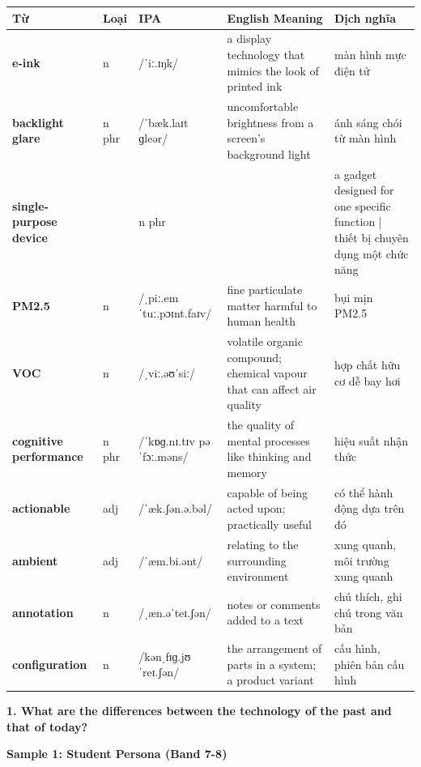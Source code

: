 \vspace{0.8em}
\begin{center}
\renewcommand{\arraystretch}{1.65}
\begin{tabularx}{\textwidth}{|V{0.22\textwidth}|C{0.07\textwidth}|I{0.20\textwidth}|Y|V{0.18\textwidth}|}
\hline
{}
\textbf{Từ} & \textbf{Loại} & \textbf{IPA} & \textbf{English Meaning} & \textbf{Dịch nghĩa} \\
\hline
\textbf{e-ink} & n & /ˈiː.ɪŋk/ & a display technology that mimics the look of printed ink & màn hình mực điện tử \\ \hline
\textbf{backlight glare} & n phr & /ˈbæk.laɪt ɡleər/ & uncomfortable brightness from a screen's background light & ánh sáng chói từ màn hình \\ \hline
\textbf{single-purpose device} & & n phr & & a gadget designed for one specific function | thiết bị chuyên dụng một chức năng \\ \hline
\textbf{PM2.5} & n & /ˌpiː.emˈtuː.pɔɪnt.faɪv/ & fine particulate matter harmful to human health & bụi mịn PM2.5 \\ \hline
\textbf{VOC} & n & /ˌviː.əʊˈsiː/ & volatile organic compound; chemical vapour that can affect air quality & hợp chất hữu cơ dễ bay hơi \\ \hline
\textbf{cognitive performance} & n phr & /ˈkɒɡ.nɪ.tɪv pəˈfɔː.məns/ & the quality of mental processes like thinking and memory & hiệu suất nhận thức \\ \hline
\textbf{actionable} & adj & /ˈæk.ʃən.ə.bəl/ & capable of being acted upon; practically useful & có thể hành động dựa trên đó \\ \hline
\textbf{ambient} & adj & /ˈæm.bi.ənt/ & relating to the surrounding environment & xung quanh, môi trường xung quanh \\ \hline
\textbf{annotation} & n & /ˌæn.əˈteɪ.ʃən/ & notes or comments added to a text & chú thích, ghi chú trong văn bản \\ \hline
\textbf{configuration} & n & /kənˌfɪɡ.jʊˈreɪ.ʃən/ & the arrangement of parts in a system; a product variant & cấu hình, phiên bản cấu hình \\ \hline
\end{tabularx}
\end{center}

\partthreeheader

\begin{ieltsquestion}
\textbf{1. What are the differences between the technology of the past and that of today?}
\end{ieltsquestion}
\textbf{Sample 1: Student Persona (Band 7-8)}

